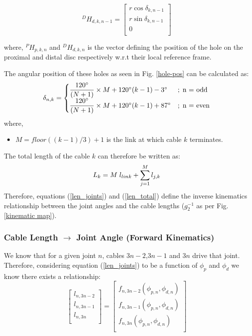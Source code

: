 \documentclass[a4paper,12pt]{report}
\begin{document}
\begin{equation*}
^DH_{d,k,n-1}=\begin{bmatrix}
r\cos{\delta_{k,n-1}}\\
r\sin{\delta_{k,n-1}}\\
0\\
\end{bmatrix} 
\end{equation*}

where, $^PH_{p,k,n}$ and $^DH_{d,k,n}$ is the vector defining the position of the hole on the proximal and distal disc respectively w.r.t their local reference frame.

The angular position of these holes as seen in Fig. \ref{hole-pos} can be calculated as:
\begin{equation}
\label{delta-hole-pos}
\delta_{n,k} =
\begin{cases}
\dfrac{120^{\circ}}{(N+1)} \times M +120^{\circ}(k-1) - 3^{\circ} &; \hspace{1mm}  \text{n = odd}   \\
\dfrac{120^{\circ}}{(N+1)} \times M +120^{\circ}(k-1) + 87^{\circ} &; \hspace{1mm}  \text{n = even}
\end{cases}
\end{equation}
where,
\begin{itemize}
	\renewcommand\labelitemi{--}
	\item $M = floor((k-1)/3)+1$ is the link at which cable $k$ terminates.
\end{itemize}
The total length of the cable $k$ can therefore be written as:
\begin{equation}
\label{len_total}
L_k= M\hspace{1mm}l_{link} + \sum_{j=1}^{M}l_{j,k}
\end{equation}
Therefore,  equations (\ref{len_joints}) and (\ref{len_total}) define the inverse kinematics relationship between the joint angles and the cable lengths ($g_{2}^{-1}$ as per Fig. \ref{kinematic map}).

\subsubsection{Cable Length \textbf{$\longrightarrow$} Joint Angle (Forward Kinematics)}
\label{numerical-case-1}
We know that for a given joint $n$, cables $3n-2$,$3n-1$ and $3n$ drive that joint. Therefore, considering equation (\ref{len_joints}) to be a function of $\phi_p$ and $\phi_d$ we know there exists a relationship:
\begin{equation}
\begin{bmatrix}
l_{n,3n-2}\\
l_{n,3n-1}\\
l_{n,3n}\\
\end{bmatrix} =
\begin{bmatrix}
f_{n,3n-2}(\phi_{p,n},\phi_{d,n})\\
f_{n,3n-1}(\phi_{p,n},\phi_{d,n})\\
f_{n,3n}(\phi_{p,n},\phi_{d,n})\\
\end{bmatrix}
\label{function_of_l}
\end{equation}
\end{document}
